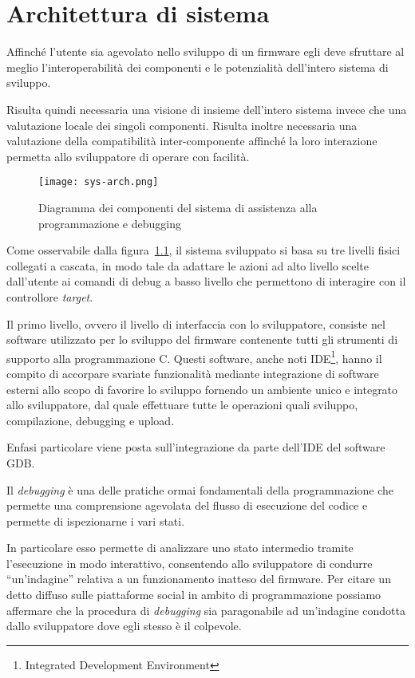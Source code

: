 \chapter{Architettura di sistema}

Affinché l'utente sia agevolato nello sviluppo di un firmware egli deve sfruttare al meglio l'interoperabilità dei componenti e le potenzialità dell'intero sistema di sviluppo.

Risulta quindi necessaria una visione di insieme dell'intero sistema invece che una valutazione locale dei singoli componenti. Risulta inoltre necessaria una valutazione della compatibilità inter-componente affinché la loro interazione permetta allo sviluppatore di operare con facilità.

\begin{figure}[t]
    \centering
    \texttt{[image: sys-arch.png]}
    \caption[]{Diagramma dei componenti del sistema di assistenza alla programmazione e debugging}\label{fig:sys-arch}
\end{figure}

Come osservabile dalla figura~\ref{fig:sys-arch}, il sistema sviluppato si basa su tre livelli fisici collegati a cascata, in modo tale da adattare le azioni ad alto livello scelte dall'utente ai comandi di debug a basso livello che permettono di interagire con il controllore \textit{target}. 

Il primo livello, ovvero il livello di interfaccia con lo sviluppatore, consiste nel software utilizzato per lo sviluppo del firmware contenente tutti gli strumenti di supporto alla programmazione C. Questi software, anche noti IDE\footnote{Integrated Development Environment}, hanno il compito di accorpare svariate funzionalità mediante integrazione di software esterni allo scopo di favorire lo sviluppo fornendo un ambiente unico e integrato allo sviluppatore, dal quale effettuare tutte le operazioni quali sviluppo, compilazione, debugging e upload.

Enfasi particolare viene posta sull'integrazione da parte dell'IDE del software GDB.\@

Il \textit{debugging} è una delle pratiche ormai fondamentali della programmazione che permette una comprensione agevolata del flusso di esecuzione del codice e permette di ispezionarne i vari stati.

In particolare esso permette di analizzare uno stato intermedio tramite l'esecuzione in modo interattivo, consentendo allo sviluppatore di condurre ``un'indagine'' relativa a un funzionamento inatteso del firmware. Per citare un detto diffuso sulle piattaforme social in ambito di programmazione possiamo affermare che la procedura di \textit{debugging} sia paragonabile ad un'indagine condotta dallo sviluppatore dove egli stesso è il colpevole.

